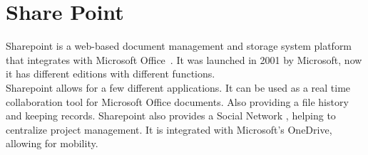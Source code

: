 \section{Share Point}

Sharepoint is a web-based document management and storage system platform that 
integrates with Microsoft Office~\cite{www-hid-sp18-601-spoint-website}. It was
 launched in 2001 by Microsoft, now it 
has different editions with different functions.\\

Sharepoint allows for a few different applications. It can be used as a real 
time collaboration tool for Microsoft Office documents. Also providing a 
file history and keeping records. Sharepoint also provides a Social Network 
\cite{www-hid-sp18-601-spoint-new-sharepoint}, 
helping to centralize project management. It is integrated with Microsoft's 
OneDrive, allowing for mobility.\\